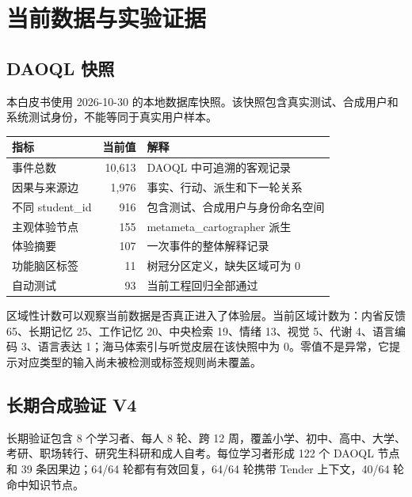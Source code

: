 \documentclass[UTF8,a4paper,11pt]{ctexart}
\begin{document}
\newpage
\section{当前数据与实验证据}

\subsection{DAOQL 快照}

本白皮书使用 2026-10-30 的本地数据库快照。该快照包含真实测试、合成用户和系统测试身份，不能等同于真实用户样本。

\begin{center}
\begin{longtable}{@{}p{5.0cm}r p{5.5cm}@{}}
\toprule
\textbf{指标} & \textbf{当前值} & \textbf{解释} \\
\midrule
事件总数 & 10,613 & DAOQL 中可追溯的客观记录 \\
因果与来源边 & 1,976 & 事实、行动、派生和下一轮关系 \\
不同 student\_id & 916 & 包含测试、合成用户与身份命名空间 \\
主观体验节点 & 155 & metameta\_cartographer 派生 \\
体验摘要 & 107 & 一次事件的整体解释记录 \\
功能脑区标签 & 11 & 树冠分区定义，缺失区域可为 0 \\
自动测试 & 93 & 当前工程回归全部通过 \\
\bottomrule
\end{longtable}
\end{center}

区域性计数可以观察当前数据是否真正进入了体验层。当前区域计数为：内省反馈 65、长期记忆 25、工作记忆 20、中央检索 19、情绪 13、视觉 5、代谢 4、语言编码 3、语言表达 1；海马体索引与听觉皮层在该快照中为 0。零值不是异常，它提示对应类型的输入尚未被检测或标签规则尚未覆盖。

\subsection{长期合成验证 V4}

长期验证包含 8 个学习者、每人 8 轮、跨 12 周，覆盖小学、初中、高中、大学、考研、职场转行、研究生科研和成人自考。每位学习者形成 122 个 DAOQL 节点和 39 条因果边；64/64 轮都有有效回复，64/64 轮携带 Tender 上下文，40/64 轮命中知识节点。
\end{document}
